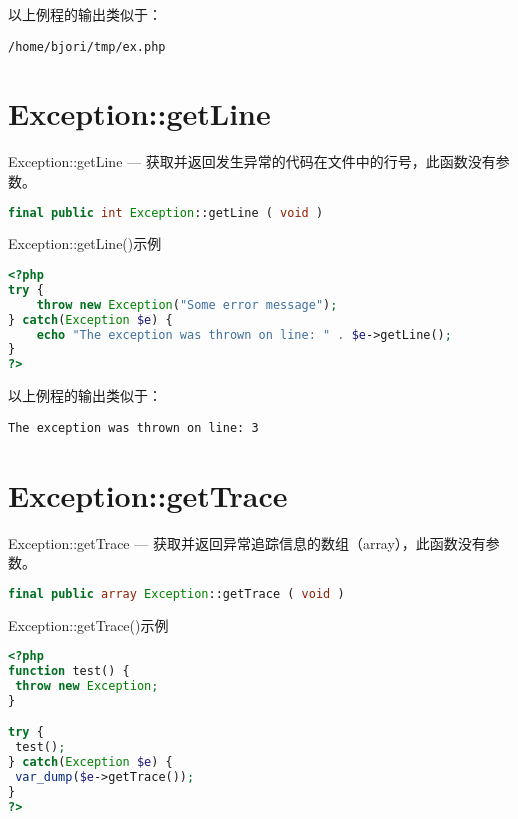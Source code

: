 以上例程的输出类似于：

\begin{verbatim}
/home/bjori/tmp/ex.php
\end{verbatim}


\section{Exception::getLine}

Exception::getLine — 获取并返回发生异常的代码在文件中的行号，此函数没有参数。


\begin{lstlisting}[language=PHP]
final public int Exception::getLine ( void )
\end{lstlisting}




\begin{example}
Exception::getLine()示例
\begin{lstlisting}[language=PHP]
<?php
try {
    throw new Exception("Some error message");
} catch(Exception $e) {
    echo "The exception was thrown on line: " . $e->getLine();
}
?>
\end{lstlisting}
\end{example}

以上例程的输出类似于：

\begin{verbatim}
The exception was thrown on line: 3
\end{verbatim}


\section{Exception::getTrace}

Exception::getTrace — 获取并返回异常追踪信息的数组（array），此函数没有参数。

\begin{lstlisting}[language=PHP]
final public array Exception::getTrace ( void )
\end{lstlisting}




\begin{example}
Exception::getTrace()示例
\begin{lstlisting}[language=PHP]
<?php
function test() {
 throw new Exception;
}

try {
 test();
} catch(Exception $e) {
 var_dump($e->getTrace());
}
?>
\end{lstlisting}
\end{example}


